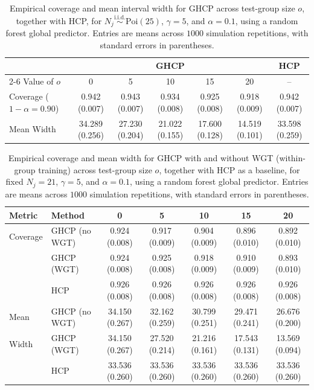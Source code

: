 \begin{table}[h]
\centering
\caption{Empirical coverage and mean interval width for GHCP across test-group size $o$, together with HCP, for $N_j\overset{\mathrm{i.i.d.}}{\sim}\mathrm{Poi}(25)$, $\gamma=5$, and $\alpha=0.1$, using a random forest global predictor. Entries are means across $1000$ simulation repetitions, with standard errors in parentheses.}
\label{tab:dhcp-hcp-poisson-alpha01}
\small
\setlength{\tabcolsep}{6pt}
\begin{tabular}{lcccccc}
\toprule
& \multicolumn{5}{c}{GHCP} & HCP \\
\cmidrule(lr){2-6}
Value of $o$ & 0 & 5 & 10 & 15 & 20 & -- \\
\midrule
Coverage ($1-\alpha=0.90$)
& 0.942 (0.007)
& 0.943 (0.007)
& 0.934 (0.008)
& 0.925 (0.008)
& 0.918 (0.009)
& 0.942 (0.007) \\
Mean Width
& 34.289 (0.256)
& 27.230 (0.204)
& 21.022 (0.155)
& 17.600 (0.128)
& 14.519 (0.101)
& 33.598 (0.259) \\
\bottomrule
\end{tabular}
\end{table}

\begin{table}[t]
\centering
\caption{Empirical coverage and mean width for GHCP with and without WGT (within-group training) across test-group size $o$, together with HCP as a baseline, for fixed $N_j=21$, $\gamma=5$, and $\alpha=0.1$, using a random forest global predictor. Entries are means across $1000$ simulation repetitions, with standard errors in parentheses.}
\label{tab:sim-with-vs-without-training}
\small
\setlength{\tabcolsep}{5pt}
\begin{tabular}{llccccc}
\toprule
Metric & Method & 0 & 5 & 10 & 15 & 20 \\
\midrule
Coverage
& GHCP (no WGT) & 0.924 (0.008) & 0.917 (0.009) & 0.904 (0.009) & 0.896 (0.010) & 0.892 (0.010) \\
& GHCP (WGT) & 0.924 (0.008) & 0.925 (0.008) & 0.918 (0.009) & 0.910 (0.009) & 0.893 (0.010) \\
& HCP & 0.926 (0.008) & 0.926 (0.008) & 0.926 (0.008) & 0.926 (0.008) & 0.926 (0.008) \\
\addlinespace
Mean
& GHCP (no WGT) & 34.150 (0.267) & 32.162 (0.259) & 30.799 (0.251) & 29.471 (0.241) & 26.676 (0.200) \\
Width & GHCP (WGT)  & 34.150 (0.267) & 27.520 (0.214) & 21.216 (0.161) & 17.543 (0.131) & 13.569 (0.094) \\
& HCP            & 33.536 (0.260) & 33.536 (0.260) & 33.536 (0.260) & 33.536 (0.260) & 33.536 (0.260) \\
\bottomrule
\end{tabular}
\end{table}
